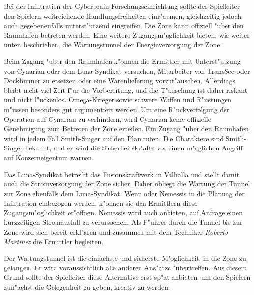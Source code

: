Bei der Infiltration der Cyberbrain-Forschungseinrichtung sollte der Spielleiter den Spielern weitreichende Handlungsfreiheiten einr"aumen, gleichzeitig jedoch auch gegebenenfalls unterst"utzend eingreifen. Die Zone kann offiziell "uber den Raumhafen betreten werden. Eine weitere Zugangsm"oglichkeit bieten, wie weiter unten beschrieben, die Wartungstunnel der Energieversorgung der Zone.

Beim Zugang "uber den Raumhafen k"onnen die Ermittler mit Unterst"utzung von Cynarian oder dem Luna-Syndikat versuchen, Mitarbeiter von TransSec oder Dockbunner zu ersetzen oder eine Warenlieferung vorzut"auschen. Allerdings bleibt nicht viel Zeit f"ur die Vorbereitung, und die T"auschung ist daher riskant und nicht l"uckenlos. Omega-Krieger sowie schwere Waffen und R"ustungen m"ussen besonders gut argumentiert werden. Um eine R"uckverfolgung der Operation auf Cynarian zu verhindern, wird Cynarian keine offizielle Genehmigung zum Betreten der Zone erteilen. Ein Zugang "uber den Raumhafen wird in jedem Fall Smith-Singer auf den Plan rufen. Die Charaktere sind Smith-Singer bekannt, und er wird die Sicherheitskr"afte vor einen m"oglichen Angriff auf Konzerneigentum warnen. 

Das Luna-Syndikat betreibt das Fusionskraftwerk in Valhalla und stellt damit auch die Stromversorgung der Zone sicher. Daher obliegt die Wartung der Tunnel zur Zone ebenfalls dem Luna-Syndikat. Wenn \xl{} oder Nemessis in die Planung der Infiltration einbezogen werden, k"onnen sie den Ermittlern diese Zugangsm"oglichkeit er"offnen. Nemessis wird auch anbieten, auf Anfrage einen kurzzeitigen Stromausfall zu verursachen. Als F"uhrer durch die Tunnel bis zur Zone wird sich \xl{} bereit erkl"aren und zusammen mit dem Techniker \emph{Roberto Martinez} die Ermittler begleiten.

\begin{remarks}
	Der Wartungstunnel ist die einfachste und sicherste M"oglichkeit, in die Zone zu gelangen. Er wird voraussichtlich alle anderen Ans"atze "ubertreffen. Aus diesem Grund sollte der Spielleiter diese Alternative erst sp"at anbieten, um den Spielern zun"achst die Gelegenheit zu geben, kreativ zu werden.
\end{remarks}

